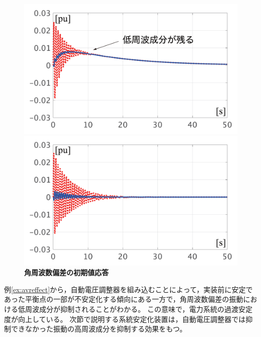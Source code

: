 \documentclass[tombow,dvipdfmx]{corona-a5-1.1}
\begin{document}
\begin{figure}[t]
  \centering
  {
  \begin{minipage}{0.49\linewidth}
    \centering
    \includegraphics[width = 1.0\linewidth]{figs/woAVRlarge}
  \end{minipage}
  \begin{minipage}{0.49\linewidth}
    \centering
    \includegraphics[width = 1.0\linewidth]{figs/wAVRlarge}
  \end{minipage}
  \medskip
  \caption{\textbf{角周波数偏差の初期値応答}
  \\  
}
  \label{fig:avrlarged}
  }
\medskip
\end{figure}



例\ref{ex:avreffect}から，自動電圧調整器を組み込むことによって，実装前に安定であった平衡点の一部が不安定化する傾向にある一方で，角周波数偏差の振動における低周波成分が抑制されることがわかる。
この意味で，電力系統の過渡安定度が向上している。
次節で説明する系統安定化装置は，自動電圧調整器では抑制できなかった振動の高周波成分を抑制する効果をもつ。
\end{document}
